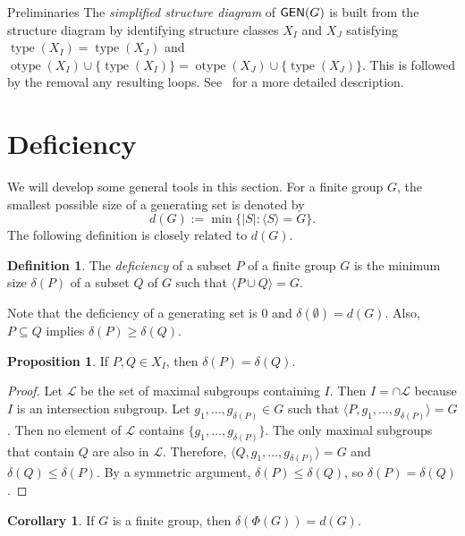 \documentclass[12pt]{amsart}
\theoremstyle{definition}
\newtheorem{corollary}[equation]{Corollary}
\newtheorem{proposition}[equation]{Proposition}
\theoremstyle{definition}
\newtheorem{definition}[equation]{Definition}
\numberwithin{equation}{section}
\begin{document}
\begin{section}{Preliminaries}
The \emph{simplified structure diagram} of ${\text{\sf GEN}}(G)$ is built from the structure diagram by identifying 
structure classes 
$X_I$ and $X_J$ satisfying ${\operatorname{type}}(X_I)={\operatorname{type}}(X_J)$ and ${\operatorname{otype}}(X_I) \cup \{{\operatorname{type}}(X_I)\} = {\operatorname{otype}}(X_J) \cup \{{\operatorname{type}}(X_J)\}$.
This is followed by the removal any resulting loops. See~\cite{ErnstSieben} for a more detailed description.

\end{section}

\section{Deficiency}

We will develop some general tools in this section.  For a finite group $G$, the smallest possible size of a generating set is denoted by \[{d}(G) :=  \min\{|S| : \langle S \rangle=G\}.\]   The following definition is closely related to ${d}(G)$. 

\begin{definition}
The \emph{deficiency} of a subset $P$ of a finite group $G$ is the minimum size ${\delta}(P)$ of a subset $Q$ of $G$ such that $\langle P\cup Q\rangle=G$.   
\end{definition}

Note that the deficiency of a generating set is $0$ and $\delta(\emptyset)=d(G)$.  Also, $P \subseteq Q$ implies ${\delta}(P) \geq {\delta}(Q)$.

\begin{proposition}\label{prop:EqualDeficiencies}
If $P,Q\in X_I$, then ${\delta}(P)={\delta}(Q)$. 
\end{proposition}

\begin{proof}
Let $\mathcal{L}$ be the set of maximal subgroups containing $I$.  Then $I=\cap \mathcal{L}$ because $I$ is an intersection subgroup.  Let $g_1,\ldots,g_{{\delta}(P)} \in G$ such that $\langle P,g_1,\ldots,g_{{\delta}(P)} \rangle = G$.  Then no element of $\mathcal{L}$ contains $\{g_1,\ldots,g_{{\delta}(P)}\}$.  The only maximal subgroups that contain $Q$ are also in $\mathcal{L}$. Therefore, $\langle Q,g_1,\ldots,g_{{\delta}(P)}\rangle=G$ and ${\delta}(Q) \leq {\delta}(P)$.  By a symmetric argument, ${\delta}(P) \leq {\delta}(Q)$, so ${\delta}(P)={\delta}(Q)$. 
\end{proof}

\begin{corollary}\label{cor:PhiDeficiency}
If $G$ is a finite group, then ${\delta}(\Phi(G)) = d(G)$.
\end{corollary}
\end{document}
